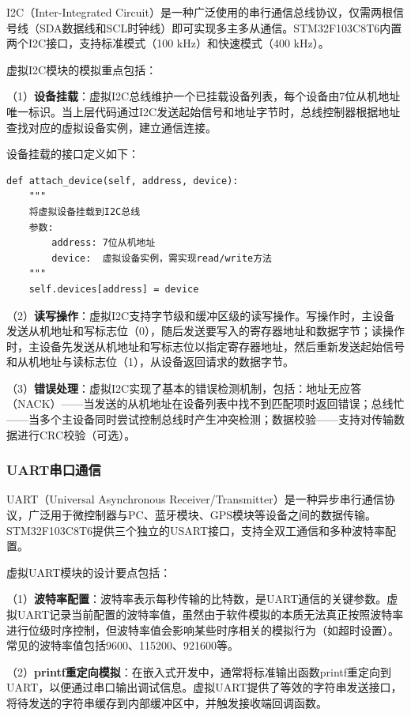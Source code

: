 \documentclass[12pt,a4paper]{ctexart}
\begin{document}
I2C（Inter-Integrated Circuit）是一种广泛使用的串行通信总线协议，仅需两根信号线（SDA数据线和SCL时钟线）即可实现多主多从通信。STM32F103C8T6内置两个I2C接口，支持标准模式（100 kHz）和快速模式（400 kHz）。

虚拟I2C模块的模拟重点包括：

（1）\textbf{设备挂载}：虚拟I2C总线维护一个已挂载设备列表，每个设备由7位从机地址唯一标识。当上层代码通过I2C发送起始信号和地址字节时，总线控制器根据地址查找对应的虚拟设备实例，建立通信连接。

设备挂载的接口定义如下：
\begin{lstlisting}[caption={虚拟I2C设备挂载接口},label={lst:i2c_attach}]
def attach_device(self, address, device):
    """
    将虚拟设备挂载到I2C总线
    参数:
        address: 7位从机地址
        device:  虚拟设备实例，需实现read/write方法
    """
    self.devices[address] = device
\end{lstlisting}

（2）\textbf{读写操作}：虚拟I2C支持字节级和缓冲区级的读写操作。写操作时，主设备发送从机地址和写标志位（0），随后发送要写入的寄存器地址和数据字节；读操作时，主设备先发送从机地址和写标志位以指定寄存器地址，然后重新发送起始信号和从机地址与读标志位（1），从设备返回请求的数据字节。

（3）\textbf{错误处理}：虚拟I2C实现了基本的错误检测机制，包括：地址无应答（NACK）——当发送的从机地址在设备列表中找不到匹配项时返回错误；总线忙——当多个主设备同时尝试控制总线时产生冲突检测；数据校验——支持对传输数据进行CRC校验（可选）。

\subsubsection{UART串口通信}

UART（Universal Asynchronous Receiver/Transmitter）是一种异步串行通信协议，广泛用于微控制器与PC、蓝牙模块、GPS模块等设备之间的数据传输。STM32F103C8T6提供三个独立的USART接口，支持全双工通信和多种波特率配置。

虚拟UART模块的设计要点包括：

（1）\textbf{波特率配置}：波特率表示每秒传输的比特数，是UART通信的关键参数。虚拟UART记录当前配置的波特率值，虽然由于软件模拟的本质无法真正按照波特率进行位级时序控制，但波特率值会影响某些时序相关的模拟行为（如超时设置）。常见的波特率值包括9600、115200、921600等。

（2）\textbf{printf重定向模拟}：在嵌入式开发中，通常将标准输出函数printf重定向到UART，以便通过串口输出调试信息。虚拟UART提供了等效的字符串发送接口，将待发送的字符串缓存到内部缓冲区中，并触发接收端回调函数。
\end{document}
